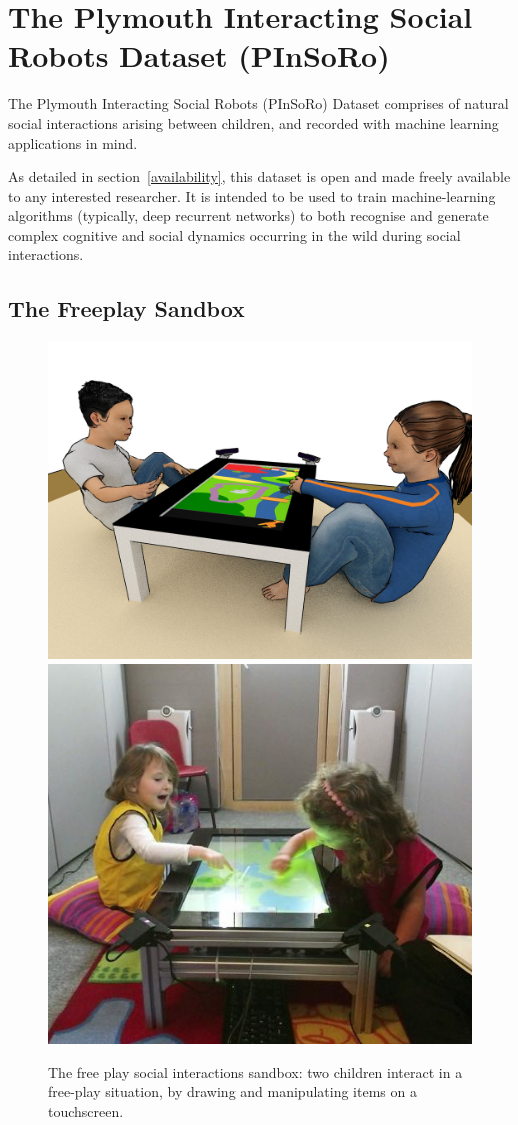 \documentclass{article}
\begin{document}

\section{The Plymouth Interacting Social Robots Dataset (PInSoRo)}


The Plymouth Interacting Social Robots (PInSoRo) Dataset comprises of natural
social interactions arising between children, and recorded with machine learning
applications in mind.

As detailed in section~\ref{availability}, this dataset is open and made freely
available to any interested researcher. It is intended to be used to train
machine-learning algorithms (typically, deep recurrent networks) to both
recognise and generate complex cognitive and social dynamics occurring in the
wild during social interactions.

\subsection{The Freeplay Sandbox}

\begin{figure}
    \centering
    \includegraphics[width=0.55\linewidth]{setup-child-child.png}
    \hspace{1em}
    \includegraphics[width=0.4\linewidth]{child-child-env}
    \caption{The free play social interactions sandbox: two children interact in
    a free-play situation, by drawing and manipulating items on a touchscreen.}
    \label{fig|freeplay}
\end{figure}
\end{document}
